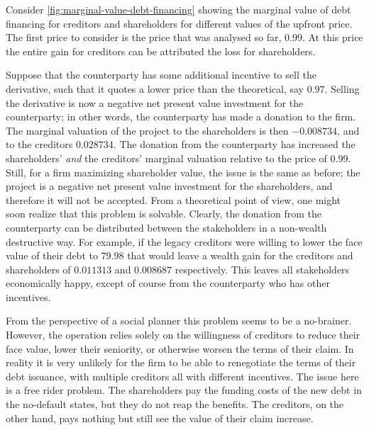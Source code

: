 \documentclass[main.tex]{subfiles}
\begin{document}
        Consider \cref{fig:marginal-value-debt-financing} showing the marginal value 
        of debt financing for creditors and shareholders for different values of the upfront price.
        The first price to consider is the price that was analysed so far, $\num{0.99}$.
        At this price the entire gain for creditors can be attributed the loss for shareholders.

        Suppose that the counterparty has some additional incentive to sell the derivative,
        such that it quotes a lower price than the theoretical, say $\num{0.97}$.
        Selling the derivative is now a negative net present value investment for the counterparty;
        in other words, the counterparty has made a donation to the firm. 
        The marginal valuation of the project to the shareholders is then $\num{-0.008734}$,
        and to the creditors $\num{0.028734}$.
        The donation from the counterparty has increased the shareholders' 
        \textit{and} the creditors' marginal valuation relative to the price of $\num{0.99}$.
        Still, for a firm maximizing shareholder value, the issue is the same as before;
        the project is a negative net present value investment for the shareholders,
        and therefore it will not be accepted.
        From a theoretical point of view, one might soon realize that this problem is solvable.
        Clearly, the donation from the counterparty can be distributed between the 
        stakeholders in a non-wealth destructive way. 
        For example, if the legacy creditors were willing to lower the face value of their debt
        to $\num{79.98}$ that would leave a wealth gain for the creditors and shareholders
        of $\num{0.011313}$ and $\num{0.008687}$ respectively.
        This leaves all stakeholders economically happy, 
        except of course from the counterparty who has other incentives.

        From the perspective of a social planner this problem seems to be a no-brainer. 
        However, the operation relies solely on the willingness of creditors to 
        reduce their face value, lower their seniority, or otherwise worsen the terms of their claim.
        In reality it is very unlikely for the firm to be able to renegotiate 
        the terms of their debt issuance, with multiple creditors all with different incentives.
        The issue here is a free rider problem. 
        The shareholders pay the funding costs of the new debt in the no-default states,
        but they do not reap the benefits.
        The creditors, on the other hand, pays nothing 
        but still see the value of their claim increase.
\end{document}
